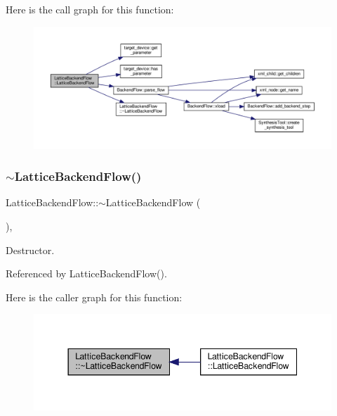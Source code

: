 Here is the call graph for this function\+:
\nopagebreak
\begin{figure}[H]
\begin{center}
\leavevmode
\includegraphics[width=350pt]{de/dd0/classLatticeBackendFlow_aa76f249f857e30947adab351737266c9_cgraph}
\end{center}
\end{figure}
\mbox{\label{classLatticeBackendFlow_a0d52950634971fbf55dfac701afddaf5}} 
\subsubsection{\texorpdfstring{$\sim$\+Lattice\+Backend\+Flow()}{~LatticeBackendFlow()}}
{\footnotesize\ttfamily Lattice\+Backend\+Flow\+::$\sim$\+Lattice\+Backend\+Flow (\begin{DoxyParamCaption}{ }\end{DoxyParamCaption})\hspace{0.3cm}{\ttfamily [override]}, {\ttfamily [default]}}



Destructor. 



Referenced by Lattice\+Backend\+Flow().

Here is the caller graph for this function\+:
\nopagebreak
\begin{figure}[H]
\begin{center}
\leavevmode
\includegraphics[width=344pt]{de/dd0/classLatticeBackendFlow_a0d52950634971fbf55dfac701afddaf5_icgraph}
\end{center}
\end{figure}



